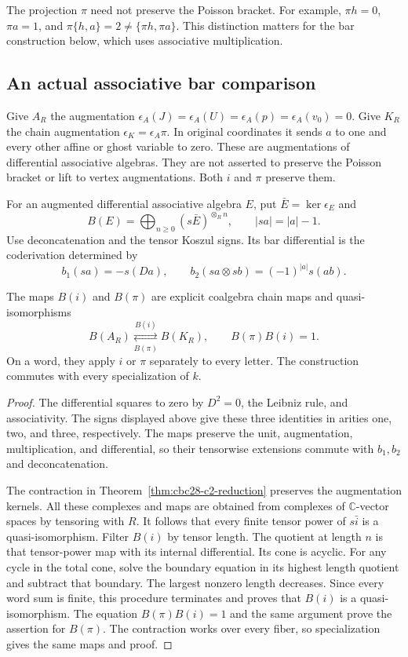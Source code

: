 The projection $\pi$ need not preserve the Poisson bracket.
For example, $\pi h=0$, $\pi a=1$, and
$\pi\{h,a\}=2\ne\{\pi h,\pi a\}$.
This distinction matters for the bar construction below, which uses associative multiplication.

\subsection{An actual associative bar comparison}

Give $A_R$ the augmentation $\epsilon_A(J)=\epsilon_A(U)=\epsilon_A(p)=\epsilon_A(v_0)=0$.
Give $K_R$ the chain augmentation $\epsilon_K=\epsilon_A\pi$.
In original coordinates it sends $a$ to one and every other affine or ghost variable to zero.
These are augmentations of differential associative algebras.
They are not asserted to preserve the Poisson bracket or lift to vertex augmentations.
Both $i$ and $\pi$ preserve them.

For an augmented differential associative algebra $E$, put $\bar E=\ker\epsilon_E$ and
\[
 B(E)=\bigoplus_{n\geq0}(s\bar E)^{\otimes_R n},\qquad |sa|=|a|-1.
\]
Use deconcatenation and the tensor Koszul signs.
Its bar differential is the coderivation determined by
\[
 b_1(sa)=-s(Da),\qquad
 b_2(sa\otimes sb)=(-1)^{|a|}s(ab).
\]

\begin{theorem}\label{thm:cbc28-bar-comparison}
The maps $B(i)$ and $B(\pi)$ are explicit coalgebra chain maps and quasi-isomorphisms
\[
 B(A_R)\underset{B(\pi)}{\overset{B(i)}{\rightleftarrows}}B(K_R),
 \qquad B(\pi)B(i)=1.
\]
On a word, they apply $i$ or $\pi$ separately to every letter.
The construction commutes with every specialization of $k$.
\end{theorem}
\begin{proof}
The differential squares to zero by $D^2=0$, the Leibniz rule, and associativity.
The signs displayed above give these three identities in arities one, two, and three, respectively.
The maps preserve the unit, augmentation, multiplication, and differential, so their tensorwise extensions commute with $b_1,b_2$ and deconcatenation.

The contraction in Theorem~\ref{thm:cbc28-c2-reduction} preserves the augmentation kernels.
All these complexes and maps are obtained from complexes of $\mathbb C$-vector spaces by tensoring with $R$.
It follows that every finite tensor power of $s\bar i$ is a quasi-isomorphism.
Filter $B(i)$ by tensor length.
The quotient at length $n$ is that tensor-power map with its internal differential.
Its cone is acyclic.
For any cycle in the total cone, solve the boundary equation in its highest length quotient and subtract that boundary.
The largest nonzero length decreases.
Since every word sum is finite, this procedure terminates and proves that $B(i)$ is a quasi-isomorphism.
The equation $B(\pi)B(i)=1$ and the same argument prove the assertion for $B(\pi)$.
The contraction works over every fiber, so specialization gives the same maps and proof.
\end{proof}

